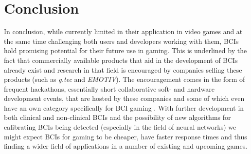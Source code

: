\chapter{Conclusion}
\label{chap:conclusion}

In conclusion, while currently limited in their application in video games and at the same time challenging both users and developers working with them, BCIs hold promising potential for their future use in gaming. This is underlined by the fact that commercially available products that aid in the development of BCIs already exist and research in that field is encouraged by companies selling these products (such as \emph{g.tec} and \emph{EMOTIV}). The encouragement comes in the form of frequent hackathons, essentially short collaborative soft- and hardware development events, that are hosted by these companies and some of which even have an own category specifically for BCI gaming \cite{IEEESMC:hackathon, emotiv:hackathon}. %
With further development in both clinical and non-clinical BCIs and the possibility of new algorithms for calibrating BCIs being detected (especially in the field of neural networks) we might expect BCIs for gaming to be cheaper, have faster response times and thus finding a wider field of applications in a number of existing and upcoming games.